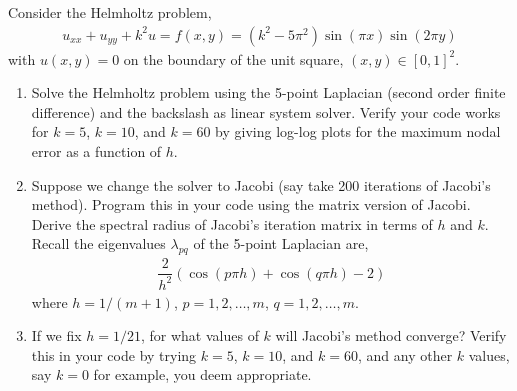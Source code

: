 \documentclass[10pt]{article}
\begin{document}
\begin{problem}
Consider the Helmholtz problem,
\begin{align*}
    u_{xx}+u_{yy}+k^2u = f(x,y)=(k^2-5\pi^2)\sin(\pi x)\sin(2\pi y)
\end{align*}
with \( u(x,y) = 0 \) on the boundary of the unit square, \( (x,y) \in [0,1]^2 \).
\begin{enumerate}[label=(\alph*),nolistsep]
    \item Solve the Helmholtz problem using the 5-point Laplacian (second order finite difference) and the backslash as linear system solver. Verify your code works for \( k = 5\), \( k = 10\), and \( k = 60 \) by giving log-log plots for the maximum nodal error as a function of \( h \).
    \item Suppose we change the solver to Jacobi (say take 200 iterations of Jacobi’s method). Program this in your code using the matrix version of Jacobi. Derive the spectral radius of Jacobi’s iteration matrix in terms of \( h \) and \( k \). Recall the eigenvalues \( \lambda_{pq} \) of the 5-point Laplacian are,
    \begin{align*}
        \dfrac{2}{h^2}(\cos(p\pi h)+\cos(q\pi h)-2)
    \end{align*}
    where \( h=1/(m+1) \), \( p=1,2,\ldots, m \), \( q=1,2,\ldots, m \).
    \item If we fix \( h=1/21 \), for what values of \( k \) will Jacobi's method converge? Verify this in your code by trying \( k=5 \), \( k=10 \), and \( k=60 \), and any other \( k \) values, say \( k=0 \) for example, you deem appropriate.
\end{enumerate}
\end{problem}
\end{document}
